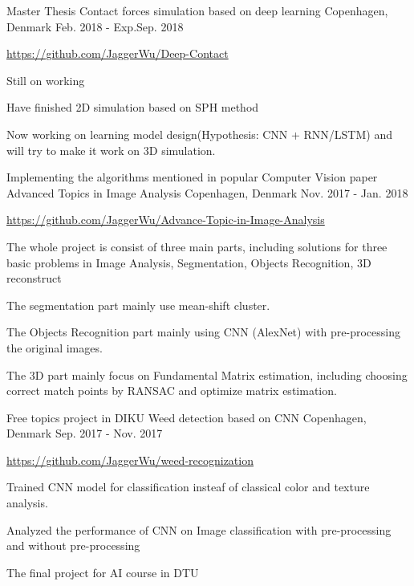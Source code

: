 \begin{cventries}
  \cventry
    {Master Thesis}
    {Contact forces simulation based on deep learning}
    {Copenhagen, Denmark}
    {Feb. 2018 - Exp.Sep. 2018}
    {
      \begin{cvitems}
        \item {\url{https://github.com/JaggerWu/Deep-Contact}}
	\item Still on working
	\item Have finished 2D simulation based on SPH method
	\item Now working on learning model design(Hypothesis: CNN + RNN/LSTM) and will try to make it work on 3D simulation.
      \end{cvitems}
    }
 \cventry
    {Implementing the algorithms mentioned in popular Computer Vision paper}
    {Advanced Topics in Image Analysis}
    {Copenhagen, Denmark}
    {Nov. 2017 - Jan. 2018}
    {
      \begin{cvitems}
        \item {\url{https://github.com/JaggerWu/Advance-Topic-in-Image-Analysis}}
        \item {The whole project is consist of three main parts, including solutions for three basic problems in Image Analysis, Segmentation, Objects Recognition, 3D reconstruct}
        \item {The segmentation part mainly use mean-shift cluster.}
        \item {The Objects Recognition part mainly using CNN (AlexNet) with pre-processing the original images.}
        \item {The 3D part mainly focus on Fundamental Matrix estimation, including choosing correct match points by RANSAC and optimize matrix estimation.}
      \end{cvitems}
    }
  \cventry
    {Free topics project in DIKU}
    {Weed detection based on CNN}
    {Copenhagen, Denmark}
    {Sep. 2017 - Nov. 2017}
    {
      \begin{cvitems}
        \item {\url{https://github.com/JaggerWu/weed-recognization}}
        \item {Trained CNN model for classification insteaf of classical color and texture analysis. }
        \item {Analyzed the performance of CNN on Image classification with pre-processing and without pre-processing }
      \end{cvitems}
    }
  \cventry
    {The final project for AI course in DTU}

\end{cventries}
